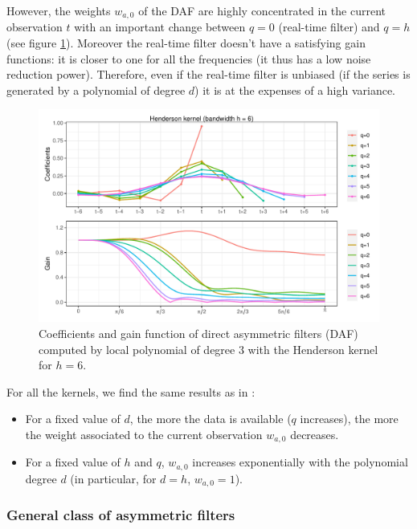 \documentclass[
  12pt,
  ,
  a4paper]{article}
\newcommand\1{\mathds{1}}
\begin{document}
However, the weights \(w_{a,0}\) of the DAF are highly concentrated in the current observation \(t\) with an important change between \(q=0\) (real-time filter) and \(q=h\) (see figure \ref{fig:filtersdafcoefs}).
Moreover the real-time filter doesn't have a satisfying gain functions: it is closer to one for all the frequencies (it thus has a low noise reduction power).
Therefore, even if the real-time filter is unbiased (if the series is generated by a polynomial of degree \(d\)) it is at the expenses of a high variance.

\begin{figure}[!ht]
\includegraphics[width=\textwidth]{img/daf/coef_gain_1}
\caption{Coefficients and gain function of direct asymmetric filters (DAF) computed by local polynomial of degree $3$ with the Henderson kernel for $h=6$.}\label{fig:filtersdafcoefs}\footnotesize
\end{figure}

For all the kernels, we find the same results as in \textcite{proietti2008}:

\begin{itemize}
\item
  For a fixed value of \(d\), the more the data is available (\(q\) increases), the more the weight associated to the current observation \(w_{a,0}\) decreases.
\item
  For a fixed value of \(h\) and \(q\), \(w_{a,0}\) increases exponentially with the polynomial degree \(d\) (in particular, for \(d=h\), \(w_{a,0}=1\)).
\end{itemize}

\hypertarget{subsec:lppasymf}{%
\subsubsection{General class of asymmetric filters}\label{subsec:lppasymf}}
\end{document}
